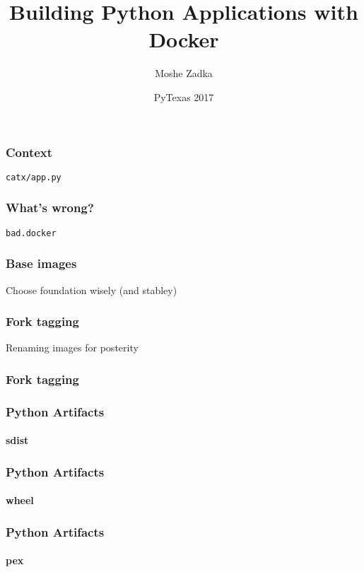 \documentclass{beamer}
\title{Building Python Applications with Docker}
\author{Moshe Zadka}
\date{PyTexas 2017}
\begin{document}
 
\frame{\titlepage}

\begin{frame}[fragile]
\frametitle{Context}
\verb|catx/app.py|

\end{frame}

\begin{frame}[fragile]
\frametitle{What's wrong?}
\verb|bad.docker|

\end{frame}


\begin{frame}
\frametitle{Base images}
Choose foundation wisely (and stabley)
\end{frame}

\begin{frame}
\frametitle{Fork tagging}
Renaming images for posterity
\end{frame}

\begin{frame}[fragile]
\frametitle{Fork tagging}

\end{frame}

\begin{frame}[fragile]
\frametitle{Python Artifacts}
\framesubtitle{sdist}
\end{frame}

\begin{frame}[fragile]
\frametitle{Python Artifacts}
\framesubtitle{wheel}
\end{frame}

\begin{frame}[fragile]
\frametitle{Python Artifacts}
\framesubtitle{pex}
\end{frame}
\end{document}
